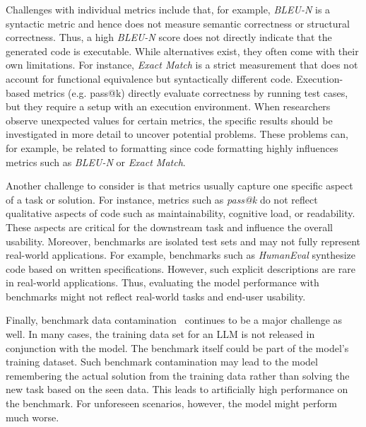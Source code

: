 Challenges with individual metrics include that, for example, \emph{BLEU-N} is a syntactic metric and hence does not measure semantic correctness or structural correctness.
Thus, a high \emph{BLEU-N} score does not directly indicate that the generated code is executable.
While alternatives exist, they often come with their own limitations.
For instance, \emph{Exact Match} is a strict measurement that does not account for functional equivalence but syntactically different code.
Execution-based metrics (e.g. pass@k) directly evaluate correctness by running test cases, but they require a setup with an execution environment.
When researchers observe unexpected values for certain metrics, the specific results should be investigated in more detail to uncover potential problems.
These problems can, for example, be related to formatting since code formatting highly influences metrics such as \emph{BLEU-N} or \emph{Exact Match}.

Another challenge to consider is that metrics usually capture one specific aspect of a task or solution.
For instance, metrics such as \emph{pass@k} do not reflect qualitative aspects of code such as maintainability, cognitive load, or readability.
These aspects are critical for the downstream task and influence the overall usability.
Moreover, benchmarks are isolated test sets and may not fully represent real-world applications.
For example, benchmarks such as \emph{HumanEval} synthesize code based on written specifications.
However, such explicit descriptions are rare in real-world applications.
Thus, evaluating the model performance with benchmarks might not reflect real-world tasks and end-user usability.

Finally, benchmark data contamination~\cite{DBLP:journals/corr/abs-2406-04244} continues to be a major challenge as well.
In many cases, the training data set for an LLM is not released in conjunction with the model.
The benchmark itself could be part of the model's training dataset.
Such benchmark contamination may lead to the model remembering the actual solution from the training data rather than solving the new task based on the seen data.
This leads to artificially high performance on the benchmark.
For unforeseen scenarios, however, the model might perform much worse.




